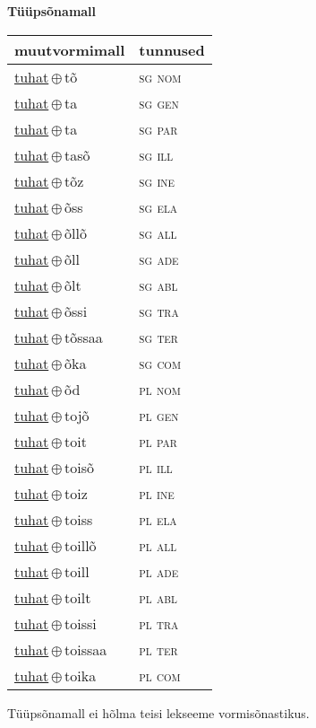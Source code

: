 

\vspace{3.5em}
\noindent \begin{minipage}{\textwidth}
\noindent \textbf{Tüüpsõnamall \,}\\

\begin{sideways}
\begin{tabular}{l l}
muutvormimall & tunnused \\
\hline
\underline{tuhat}\,$\oplus$\,tõ & \textsc{ sg nom } \\
\underline{tuhat}\,$\oplus$\,ta & \textsc{ sg gen } \\
\underline{tuhat}\,$\oplus$\,ta & \textsc{ sg par } \\
\underline{tuhat}\,$\oplus$\,tasõ & \textsc{ sg ill } \\
\underline{tuhat}\,$\oplus$\,tõz & \textsc{ sg ine } \\
\underline{tuhat}\,$\oplus$\,õss & \textsc{ sg ela } \\
\underline{tuhat}\,$\oplus$\,õllõ & \textsc{ sg all } \\
\underline{tuhat}\,$\oplus$\,õll & \textsc{ sg ade } \\
\underline{tuhat}\,$\oplus$\,õlt & \textsc{ sg abl } \\
\underline{tuhat}\,$\oplus$\,õssi & \textsc{ sg tra } \\
\underline{tuhat}\,$\oplus$\,tõssaa & \textsc{ sg ter } \\
\underline{tuhat}\,$\oplus$\,õka & \textsc{ sg com } \\
\underline{tuhat}\,$\oplus$\,õd & \textsc{ pl nom } \\
\underline{tuhat}\,$\oplus$\,tojõ & \textsc{ pl gen } \\
\underline{tuhat}\,$\oplus$\,toit & \textsc{ pl par } \\
\underline{tuhat}\,$\oplus$\,toisõ & \textsc{ pl ill } \\
\underline{tuhat}\,$\oplus$\,toiz & \textsc{ pl ine } \\
\underline{tuhat}\,$\oplus$\,toiss & \textsc{ pl ela } \\
\underline{tuhat}\,$\oplus$\,toillõ & \textsc{ pl all } \\
\underline{tuhat}\,$\oplus$\,toill & \textsc{ pl ade } \\
\underline{tuhat}\,$\oplus$\,toilt & \textsc{ pl abl } \\
\underline{tuhat}\,$\oplus$\,toissi & \textsc{ pl tra } \\
\underline{tuhat}\,$\oplus$\,toissaa & \textsc{ pl ter } \\
\underline{tuhat}\,$\oplus$\,toika & \textsc{ pl com } \\
\end{tabular}
\end{sideways}
\label{tab:tüüpsõnamall-tuhattõ}

\end{minipage}

 
\vspace{1em}
\noindent Tüüpsõnamall  ei hõlma teisi lekseeme vormi\-sõnastikus.
